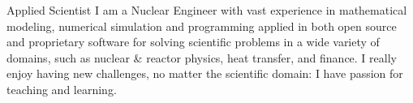 
\begin{cvskills}

	\cvskill
	{Applied Scientist}
		{I am a Nuclear Engineer with vast experience in mathematical modeling, numerical simulation and programming applied in both open source and proprietary software for solving scientific problems in a wide variety of domains, such as nuclear \& reactor physics, heat transfer, and finance. I really enjoy having new challenges, no matter the scientific domain: I have passion for teaching and learning.}

\end{cvskills}
